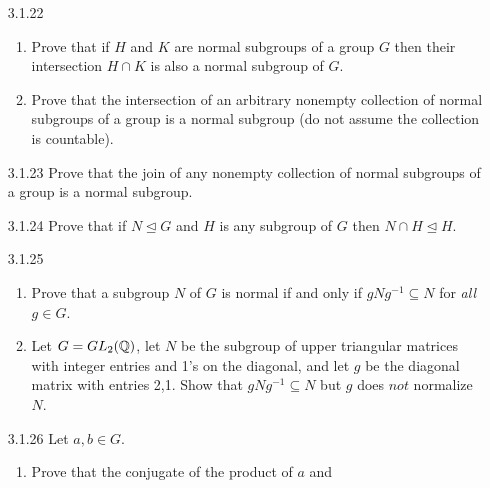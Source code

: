 \begin{enumerate}
\begin{enumerate}
                  \end{enumerate}
   \item[3.1.22]  \begin{enumerate}
                     \item Prove that if $H$ and $K$ are normal subgroups of a
                           group $G$ then their intersection $H \cap K$ is also
                           a normal subgroup of $G$.
                     \item Prove that the intersection of an arbitrary nonempty
                           collection of normal subgroups of a group is a normal
                           subgroup (do not assume the collection is countable).
                  \end{enumerate}
   \item[3.1.23]  Prove that the join of any nonempty collection of normal
                  subgroups of a group is a normal subgroup.
   \item[3.1.24]  Prove that if $N \trianglelefteq G$ and $H$ is any subgroup of
                  $G$ then $N \cap H \trianglelefteq H$.
   \item[3.1.25]  \begin{enumerate}
                     \item Prove that a subgroup $N$ of $G$ is normal if and
                           only if $gNg^{-1} \subseteq N$ for \textit{all}
                           $g \in G$.
                     \item Let $G = GL_2(\mathbb{Q})$, let $N$ be the subgroup of upper
                           triangular matrices with integer entries and 1's on
                           the diagonal, and let $g$ be the diagonal matrix with
                           entries 2,1. Show that $gNg^{-1} \subseteq N$ but $g$
                           does $\textit{not}$ normalize $N$.
                  \end{enumerate}
   \item[3.1.26]  Let $a, b \in G$.
                  \begin{enumerate}
                     \item Prove that the conjugate of the product of $a$ and

\end{enumerate}
\end{enumerate}
